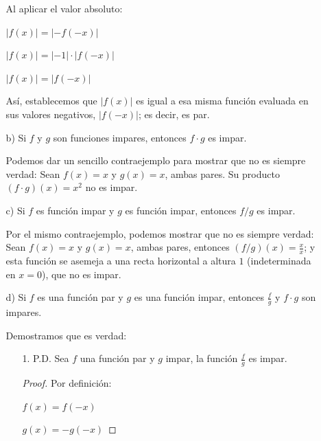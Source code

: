 \documentclass{article}
\begin{document}
\begin{enumerate}
\begin{enumerate}
        Al aplicar el valor absoluto:
        
        \(\lvert f(x) \rvert = \lvert -f(-x) \rvert \)
        
        \(\lvert f(x) \rvert = \lvert -1 \rvert \cdot \lvert f(-x) \rvert\)
        
        \(\lvert f(x) \rvert = \lvert f(-x) \rvert\)
        \vspace{\baselineskip}
        
        Así, establecemos que \( |f(x)| \) es igual a esa misma función evaluada en sus valores negativos, \( |f(-x)| \); es decir, es par.
        \vspace{\baselineskip}
        
        \item[b)] Si \( f \) y \( g \) son funciones impares, entonces \( f \cdot g \) es impar.
        
        Podemos dar un sencillo contraejemplo para mostrar que no es siempre verdad: Sean \( f(x) = x \) y \( g(x) = x \), ambas pares. Su producto \( (f \cdot g)(x) = x^2 \) no es impar.
        \vspace{\baselineskip}
        
        \item[c)] Si \( f \) es función impar y \( g \) es función impar, entonces \( f/g \) es impar.
        
        Por el mismo contraejemplo, podemos mostrar que no es siempre verdad: Sean \( f(x)=x \) y \( g(x)=x \), ambas pares, entonces \( (f/g)(x)= \frac{x}{x}\); y esta función se asemeja a una recta horizontal a altura \(1\) (indeterminada en \( x=0 \)), que no es impar.
        \vspace{\baselineskip}
        
        \item[d)] Si \( f \) es una función par y \( g \) es una función impar, entonces \( \frac{f}{g} \) y \( f \cdot g \) son impares.

        Demostramos que es verdad:
            \begin{enumerate}
                \item[1.] P.D. Sea \( f \) una función par y \( g \) impar, la función \( \frac{f}{g} \) es impar.
                
                \begin{proof} Por definición:
                
                \( f(x) = f(-x) \)
                
                \( g(x) = -g(-x) \)
                \vspace{\baselineskip}
                

\end{proof}
\end{enumerate}
\end{enumerate}
\end{enumerate}
\end{document}
